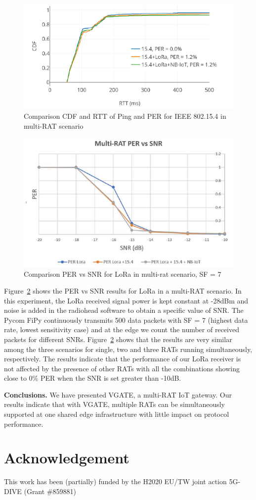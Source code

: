 \documentclass[10pt,emptycopyrightspace]{ewsn-proc}
\newcommand{\fakepar}[1]{\noindent\textbf{#1.}}
\begin{document}
\begin{figure}[t]
  \centering
	\includegraphics[width= 0.4 \textwidth]{5-5.png}
	\caption{Comparison CDF and RTT of Ping and PER for IEEE
802.15.4 in multi-RAT scenario}
	\label{fig:5-5}
\end{figure}


\begin{figure}[t]
  \vspace{-0.3cm}
	\centering
	\includegraphics[width= 0.4 \textwidth]{5-6.png}
	\caption{Comparison PER vs SNR for LoRa in multi-rat scenario, SF = 7
}
	\label{fig:5-6}
  \vspace{-0.5cm}
\end{figure}


Figure~\ref{fig:5-6} shows the PER vs SNR results for LoRa in a
multi-RAT scenario. In this experiment, the LoRa received signal power
is kept constant at -28dBm and noise is added in the radiohead
software to obtain a specific value of
SNR. The Pycom FiPy continuously transmits 500 data packets with SF =
7 (highest data rate, lowest sensitivity case) and at the edge we count the number of received packets for
different SNRs. Figure~\ref{fig:5-6} shows that the results are very similar
among the three scenarios for single, two and three RATs running
simultaneously, respectively. The results indicate that the performance of our
LoRa receiver is not affected by the presence of other RATs with all
the combinations showing close to 0\% PER when the SNR is set greater than
-10dB.

\fakepar{Conclusions} We have presented VGATE, a multi-RAT IoT gateway.
Our results indicate that with VGATE, multiple RATs can be
simultaneously supported at one shared edge infrastructure
with little impact on protocol performance.

\section*{Acknowledgement}
This work has been (partially) funded by the H2020 EU/TW joint
action 5G-DIVE (Grant \#859881)
\end{document}
